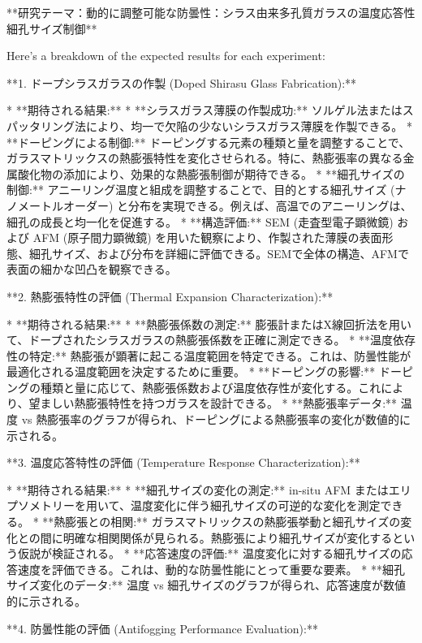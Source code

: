 \documentclass{article}
\begin{document}
**研究テーマ：動的に調整可能な防曇性：シラス由来多孔質ガラスの温度応答性細孔サイズ制御**

Here's a breakdown of the expected results for each experiment:

**1. ドープシラスガラスの作製 (Doped Shirasu Glass Fabrication):**

*   **期待される結果:**
    *   **シラスガラス薄膜の作製成功:** ソルゲル法またはスパッタリング法により、均一で欠陥の少ないシラスガラス薄膜を作製できる。
    *   **ドーピングによる制御:** ドーピングする元素の種類と量を調整することで、ガラスマトリックスの熱膨張特性を変化させられる。特に、熱膨張率の異なる金属酸化物の添加により、効果的な熱膨張制御が期待できる。
    *   **細孔サイズの制御:** アニーリング温度と組成を調整することで、目的とする細孔サイズ (ナノメートルオーダー) と分布を実現できる。例えば、高温でのアニーリングは、細孔の成長と均一化を促進する。
    *   **構造評価:** SEM (走査型電子顕微鏡) および AFM (原子間力顕微鏡) を用いた観察により、作製された薄膜の表面形態、細孔サイズ、および分布を詳細に評価できる。SEMで全体の構造、AFMで表面の細かな凹凸を観察できる。

**2. 熱膨張特性の評価 (Thermal Expansion Characterization):**

*   **期待される結果:**
    *   **熱膨張係数の測定:** 膨張計またはX線回折法を用いて、ドープされたシラスガラスの熱膨張係数を正確に測定できる。
    *   **温度依存性の特定:** 熱膨張が顕著に起こる温度範囲を特定できる。これは、防曇性能が最適化される温度範囲を決定するために重要。
    *   **ドーピングの影響:** ドーピングの種類と量に応じて、熱膨張係数および温度依存性が変化する。これにより、望ましい熱膨張特性を持つガラスを設計できる。
    *   **熱膨張率データ:** 温度 vs 熱膨張率のグラフが得られ、ドーピングによる熱膨張率の変化が数値的に示される。

**3. 温度応答特性の評価 (Temperature Response Characterization):**

*   **期待される結果:**
    *   **細孔サイズの変化の測定:** in-situ AFM またはエリプソメトリーを用いて、温度変化に伴う細孔サイズの可逆的な変化を測定できる。
    *   **熱膨張との相関:** ガラスマトリックスの熱膨張挙動と細孔サイズの変化との間に明確な相関関係が見られる。熱膨張により細孔サイズが変化するという仮説が検証される。
    *   **応答速度の評価:** 温度変化に対する細孔サイズの応答速度を評価できる。これは、動的な防曇性能にとって重要な要素。
    *   **細孔サイズ変化のデータ:** 温度 vs 細孔サイズのグラフが得られ、応答速度が数値的に示される。

**4. 防曇性能の評価 (Antifogging Performance Evaluation):**
\end{document}
